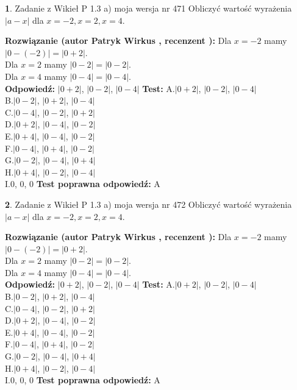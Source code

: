 \documentclass[12pt, a4paper]{article}
\theoremstyle{definition} %
\newtheorem{zad}{}
\newcommand{\zadStart}[1]{\begin{zad}#1\newline}
\newcommand{\zadStop}{\end{zad}}
\newcommand{\rozwStart}[2]{\noindent \textbf{Rozwiązanie (autor #1 , recenzent #2): }\newline}
\newcommand{\rozwStop}{\newline}
\newcommand{\odpStart}{\noindent \textbf{Odpowiedź:}\newline}
\newcommand{\odpStop}{\newline}
\newcommand{\testStart}{\noindent \textbf{Test:}\newline}
\newcommand{\testStop}{\newline}
\newcommand{\kluczStart}{\noindent \textbf{Test poprawna odpowiedź:}\newline}
\newcommand{\kluczStop}{\newline}
\begin{document}
\zadStart{Zadanie z Wikieł P 1.3 a) moja wersja nr 471}
Obliczyć wartość wyrażenia $|a - x|$ dla $x=-2,x=2,x=4$.
\zadStop
\rozwStart{Patryk Wirkus}{}
Dla $x = -2$ mamy $|0 - (-2)| = |0 + 2|$.\\
Dla $x = 2$ mamy $|0 - 2| = |0 - 2|$.\\
Dla $x = 4$ mamy $|0 - 4| = |0 - 4|$.\\
\rozwStop
\odpStart
$|0 + 2|$, $|0 - 2|$, $|0 - 4|$
\odpStop
\testStart
A.$|0 + 2|$, $|0 - 2|$, $|0 - 4|$\\
B.$|0 - 2|$, $|0 + 2|$, $|0 - 4|$\\
C.$|0 - 4|$, $|0 - 2|$, $|0 + 2|$\\
D.$|0 + 2|$, $|0 - 4|$, $|0 - 2|$\\
E.$|0 + 4|$, $|0 - 4|$, $|0 - 2|$\\
F.$|0 - 4|$, $|0 + 4|$, $|0 - 2|$\\
G.$|0 - 2|$, $|0 - 4|$, $|0 + 4|$\\
H.$|0 + 4|$, $|0 - 2|$, $|0 - 4|$\\
I.$0$, $0$, $0$
\testStop
\kluczStart
A
\kluczStop



\zadStart{Zadanie z Wikieł P 1.3 a) moja wersja nr 472}
Obliczyć wartość wyrażenia $|a - x|$ dla $x=-2,x=2,x=4$.
\zadStop
\rozwStart{Patryk Wirkus}{}
Dla $x = -2$ mamy $|0 - (-2)| = |0 + 2|$.\\
Dla $x = 2$ mamy $|0 - 2| = |0 - 2|$.\\
Dla $x = 4$ mamy $|0 - 4| = |0 - 4|$.\\
\rozwStop
\odpStart
$|0 + 2|$, $|0 - 2|$, $|0 - 4|$
\odpStop
\testStart
A.$|0 + 2|$, $|0 - 2|$, $|0 - 4|$\\
B.$|0 - 2|$, $|0 + 2|$, $|0 - 4|$\\
C.$|0 - 4|$, $|0 - 2|$, $|0 + 2|$\\
D.$|0 + 2|$, $|0 - 4|$, $|0 - 2|$\\
E.$|0 + 4|$, $|0 - 4|$, $|0 - 2|$\\
F.$|0 - 4|$, $|0 + 4|$, $|0 - 2|$\\
G.$|0 - 2|$, $|0 - 4|$, $|0 + 4|$\\
H.$|0 + 4|$, $|0 - 2|$, $|0 - 4|$\\
I.$0$, $0$, $0$
\testStop
\kluczStart
A
\kluczStop
\end{document}

